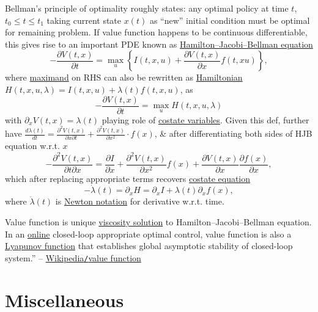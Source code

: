 \documentclass{article}
\begin{document}
{\sc Bellman}'s principle of optimality roughly states: any optimal policy at time $t$, $t_0\le t\le t_1$ taking current state $x(t)$ as ``new'' initial condition must be optimal for remaining problem. If value function happens to be continuous differentiable, this gives rise to an important PDE known as \href{https://en.wikipedia.org/wiki/Hamilton%E2%80%93Jacobi%E2%80%93Bellman_equation}{Hamilton--Jacobi--Bellman equation}
\begin{equation*}
	-\frac{\partial V(t,x)}{\partial t} = \max_u \left\{I(t,x,u) + \frac{\partial V(t,x)}{\partial x}f(t,xu)\right\},
\end{equation*}
where \href{https://en.wiktionary.org/wiki/maximand}{maximand} on RHS can also be rewritten as \href{https://en.wikipedia.org/wiki/Hamiltonian_(control_theory)}{Hamiltonian} $H(t,x,u,\lambda) = I(t,x,u) + \lambda(t)f(t,x,u)$, as
\begin{equation*}
	-\frac{\partial V(t,x)}{\partial t} = \max_u H(t,x,u,\lambda)
\end{equation*}
with $\partial_xV(t,x) = \lambda(t)$ playing role of \href{https://en.wikipedia.org/wiki/Costate_variable}{costate variables}. Given this def, further have $\frac{d\lambda(t)}{dt} = \frac{\partial^2V(t,x)}{\partial x\partial t} + \frac{\partial^2V(t,x)}{\partial x^2}\cdot f(x)$, \& after differentiating both sides of HJB equation w.r.t. $x$
\begin{equation*}
	-\frac{\partial^2V(t,x)}{\partial t\partial x} = \frac{\partial I}{\partial x} + \frac{\partial^2V(t,x)}{\partial x^2}f(x) + \frac{\partial V(t,x)}{\partial x}\frac{\partial f(x)}{\partial x},
\end{equation*}
which after replacing appropriate terms recovers \href{https://en.wikipedia.org/wiki/Costate_equation}{costate equation}
\begin{equation*}
	-\dot{\lambda}(t) = \partial_xH = \partial_xI + \lambda(t)\partial_xf(x),
\end{equation*}
where $\dot{\lambda}(t)$ is \href{https://en.wikipedia.org/wiki/Newton_notation}{Newton notation} for derivative w.r.t. time.

Value function is unique \href{https://en.wikipedia.org/wiki/Viscosity_solution}{viscosity solution} to Hamilton--Jacobi--Bellman equation. In an \href{https://en.wikipedia.org/wiki/Online_algorithm}{online} closed-loop appropriate optimal control, value function is also a \href{https://en.wikipedia.org/wiki/Lyapunov_function}{Lyapunov function} that establishes global asymptotic stability of closed-loop system.'' -- \href{https://en.wikipedia.org/wiki/Value_function}{Wikipedia{\tt/}value function}


\section{Miscellaneous}


\printbibliography[heading=bibintoc]
\end{document}
